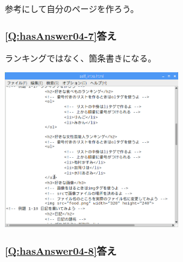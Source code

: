 \documentclass[a4paper,12pt]{jarticle}
\begin{document}
参考にして自分のページを作ろう。

\subsubsection{\bfseries
\ref*{Q:hasAnswer04-7}答え}

ランキングではなく、箇条書きになる。

\centering
\includegraphics[width=7.622cm,height=6.8cm]{textbook-img236.png}
\flushleft

\bigskip

\subsubsection{\bfseries
\ref*{Q:hasAnswer04-8}答え}
\end{document}
